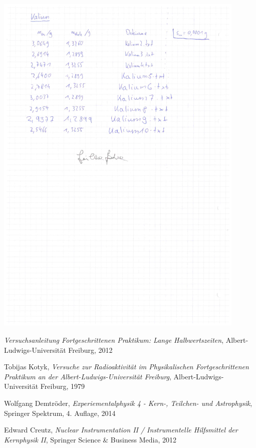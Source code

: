 \documentclass[12pt]{article}
\begin{document}
\begin{minipage}{\textwidth}
	\centering
	\includegraphics[width=0.9\textwidth]{figures/Laborbuch-2.pdf}
\end{minipage}
\newpage
\listoffigures


\newpage
\thispagestyle{empty}
\begin{thebibliography}{9}

\emph{Versuchsanleitung Fortgeschrittenen Praktikum: Lange Halbwertszeiten},
Albert-Ludwigs-Universität Freiburg,
2012

Tobijas Kotyk,
\emph{Versuche zur Radioaktivität im Physikalischen Fortgeschrittenen Praktikum an der Albert-Ludwigs-Universität Freiburg},
Albert-Ludwigs-Universität Freiburg,
1979
 
Wolfgang Demtröder,
\emph{Experiementalphysik 4 - Kern-, Teilchen- und Astrophysik},
Springer Spektrum,
4. Auflage,
2014

Edward Creutz,
\emph{Nuclear Instrumentation II / Instrumentelle Hilfsmittel der Kernphysik II},
Springer Science \& Business Media, 2012
  

\end{thebibliography}
\end{document}
